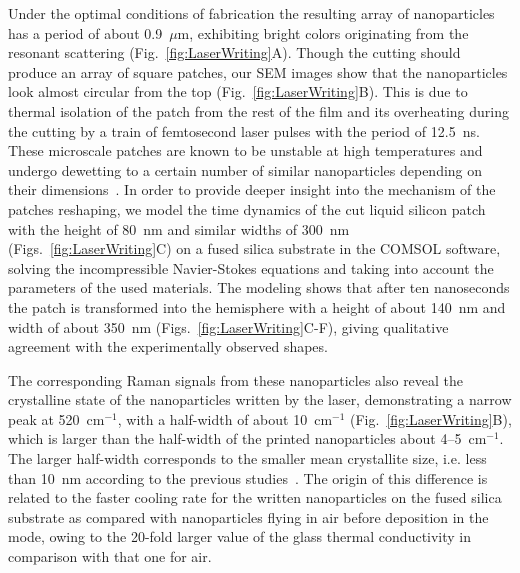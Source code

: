             Under the optimal conditions of fabrication the resulting array of nanoparticles has a period of about 0.9~$\mu$m,
            exhibiting bright colors originating from the resonant scattering (Fig.~\ref{fig:LaserWriting}A). Though the cutting should
            produce an array of square patches, our SEM images show that the nanoparticles look almost circular from the top
            (Fig.~\ref{fig:LaserWriting}B). This is due to thermal isolation of the patch from the rest of the film and its overheating
            during the cutting by a train of femtosecond laser pulses with the period of 12.5~ns. These microscale patches are
            known to be unstable at high temperatures and undergo dewetting to a certain number of similar nanoparticles depending
            on their dimensions~\cite{thompson2012solid}. In order to provide deeper insight into the mechanism of the patches reshaping,
            we model the time dynamics of the cut liquid silicon patch with the height of 80~nm and similar widths of 300~nm
            (Figs.~\ref{fig:LaserWriting}C) on a fused silica substrate in the COMSOL software, solving the incompressible Navier-Stokes
            equations and taking into account the parameters of the used materials. The modeling shows that after ten nanoseconds
            the patch is transformed into the hemisphere with a height of about 140~nm and width of about 350~nm (Figs.~\ref{fig:LaserWriting}C-F),
            giving qualitative agreement with the experimentally observed shapes.

            The corresponding Raman signals from these nanoparticles also reveal the crystalline state of the nanoparticles written
            by the laser, demonstrating a narrow peak at 520~cm$^{-1}$, with a half-width of about 10~cm$^{-1}$ (Fig.~\ref{fig:LaserWriting}B),
            which is larger than the half-width of the printed nanoparticles about 4--5~cm$^{-1}$. The larger half-width corresponds
            to the smaller mean crystallite size, i.e. less than 10~nm according to the previous studies~\cite{campbell1986effects}.
            The origin of this difference is related to the faster cooling rate for the written nanoparticles on the fused silica
            substrate as compared with nanoparticles flying in air before deposition in the  mode, owing to the 20-fold
            larger value of the glass thermal conductivity in comparison with that one for air.

